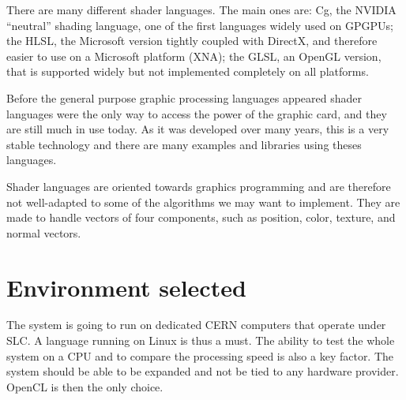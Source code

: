 There are many different shader languages. The main ones are: Cg, the
NVIDIA ``neutral'' shading language, one of the first languages widely
used on \glspl{GPGPU}; the \gls{HLSL}, the Microsoft version tightly
coupled with DirectX, and therefore easier to use on a Microsoft
platform (XNA); the \gls{GLSL}, an \gls{OpenGL} version, that is
supported widely but not implemented completely on all platforms.

Before the general purpose graphic processing languages appeared
shader languages were the only way to access the power of the graphic
card, and they are still much in use today. As it was developed over
many years, this is a very stable technology and there are many
examples and libraries using theses languages.

Shader languages are oriented towards graphics programming and are
therefore not well-adapted to some of the algorithms we may want to
implement. They are made to handle vectors of four components, such as
position, color, texture, and normal vectors.

\section{Environment selected}

The system is going to run on dedicated \gls{CERN} computers that
operate under \gls{SLC}. A language running on Linux is thus a
must. The ability to test the whole system on a \gls{CPU} and to
compare the processing speed is also a key factor. The system should
be able to be expanded and not be tied to any hardware
provider. \Gls{OpenCL} is then the only choice.

